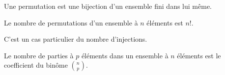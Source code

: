 \begin{defi}[Permutation]
 Une permutation est une bijection d'un ensemble fini dans lui même.
\end{defi}

\begin{propn}
Le nombre de permutations d'un ensemble à $n$ éléments est $n!$.
\end{propn}
\begin{demo}
C'est un cas particulier du nombre d'injections. 
\end{demo}
\clearpage
{}
\begin{propn}
 Le nombre de parties à $p$ éléments dans un ensemble à $n$ éléments est le coefficient du binôme $\binom{n}{p}$.
\end{propn}

